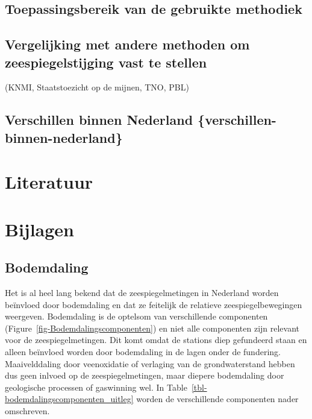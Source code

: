 \documentclass[ddraft]{deltares_report}
\begin{document}
\section{Toepassingsbereik van de gebruikte
methodiek}\label{toepassingsbereik}

\section{Vergelijking met andere methoden om zeespiegelstijging vast te
stellen}\label{zss-vergelijking}

(KNMI, Staatstoezicht op de mijnen, TNO, PBL)

\section{Verschillen binnen Nederland
\{verschillen-binnen-nederland\}}\label{verschillen-binnen-nederland-verschillen-binnen-nederland}


\chapter*{Literatuur}\label{literatuur}


\renewcommand{\bibsection}{}



\chapter*{Bijlagen}\label{bijlagen}


\section*{Bodemdaling}\label{bodemdaling}


Het is al heel lang bekend dat de zeespiegelmetingen in Nederland worden
beïnvloed door bodemdaling \citep[\citet{Veen1954}]{Veen1945} en dat ze
feitelijk de relatieve zeespiegelbewegingen weergeven. Bodemdaling is de
optelsom van verschillende componenten
(Figure~\ref{fig-Bodemdalingscomponenten}) en niet alle componenten zijn
relevant voor de zeespiegelmetingen. Dit komt omdat de stations diep
gefundeerd staan en alleen beïnvloed worden door bodemdaling in de lagen
onder de fundering. Maaivelddaling door veenoxidatie of verlaging van de
grondwaterstand hebben dus geen inlvoed op de zeespiegelmetingen, maar
diepere bodemdaling door geologische processen of gaswinning wel. In
Table~\ref{tbl-bodemdalingscomponenten_uitleg} worden de verschillende
componenten nader omschreven.
\end{document}
